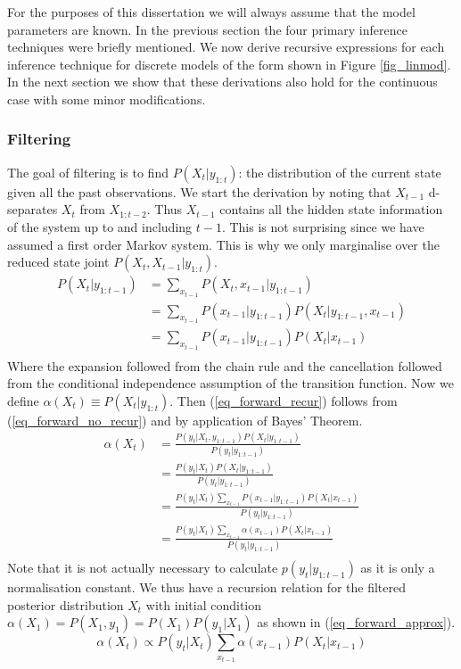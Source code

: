 \documentclass[../masters.tex]{subfiles}
\begin{document}
For the purposes of this dissertation we will always assume that the model parameters are known. In the previous section the four primary inference techniques were briefly mentioned. We now derive recursive expressions for each inference technique for discrete models of the form shown in Figure \ref{fig_linmod}. In the next section we show that these derivations also hold for the continuous case with some minor modifications.

\subsubsection{Filtering}
The goal of filtering is to find $P(X_t|y_{1:t})$: the distribution of the current state given all the past observations. We start the derivation by noting that $X_{t-1}$ d-separates $X_t$ from $X_{1:t-2}$. Thus $X_{t-1}$ contains all the hidden state information of the system up to and including $t-1$. This is not surprising since we have assumed a first order Markov system. This is why we only marginalise over the reduced state joint $P(X_t, X_{t-1}|y_{1:t})$.
\begin{equation}
\begin{aligned}
P(X_t| y_{1:t-1}) &= \sum_{x_{t-1}} P(X_t, x_{t-1}| y_{1:t-1})\\
&= \sum_{x_{t-1}} P(x_{t-1}|y_{1:t-1})P(X_t|y_{1:t-1}, x_{t-1})\\  
& = \sum_{x_{t-1}} P(x_{t-1}|y_{1:t-1})P(X_t|x_{t-1}) \\
\end{aligned}
\label{eq_forward_no_recur}
\end{equation}
Where the expansion followed from the chain rule and the cancellation followed from the conditional independence assumption of the transition function. Now we define $\alpha(X_t) \equiv P(X_t | y_{1:t})$. Then (\ref{eq_forward_recur}) follows from (\ref{eq_forward_no_recur}) and by application of Bayes' Theorem.
\begin{equation}
\begin{aligned}
\alpha(X_t) &= \frac{P(y_t|X_t, y_{1:t-1})P(X_t|y_{1:t-1})}{P(y_t|y_{1:t-1})} \\
& = \frac{P(y_t|X_t)P(X_t|y_{1:t-1})}{P(y_t|y_{1:t-1})} \\
& = \frac{P(y_t|X_t) \sum_{x_{t-1}} P(x_{t-1}|y_{1:t-1})P(X_t|x_{t-1})}{P(y_t|y_{1:t-1})} \\
& = \frac{P(y_t|X_t) \sum_{x_{t-1}} \alpha(x_{t-1})P(X_t|x_{t-1})}{P(y_t|y_{1:t-1})} \\
\end{aligned}
\label{eq_forward_recur}
\end{equation}
Note that it is not actually necessary to calculate $p(y_t|y_{1:t-1})$ as it is only a normalisation constant. We thus have a recursion relation for the filtered posterior distribution $X_t$ with initial condition $\alpha(X_1) = P(X_1, y_1) = P(X_1)P(y_1|X_1)$ as shown in (\ref{eq_forward_approx}).
\begin{equation}
\alpha(X_t) \propto P(y_t|X_t) \sum_{x_{t-1}} \alpha(x_{t-1})P(X_t|x_{t-1})
\label{eq_forward_approx}
\end{equation}
\end{document}
